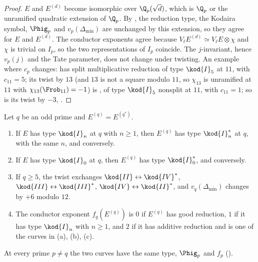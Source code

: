 \begin{proof}
$E$ and $E^{(d)}$ become isomorphic over $\Q_p(\sqrt d)$, which is $\Q_p$ or the unramified quadratic extension of $\Q_p$. By
, the reduction type, the Kodaira symbol, $\Phig_p$ and $v_p(\Delta_{\min})$ are unchanged by this
extension, so they agree for $E$ and $E^{(d)}$. The conductor exponents agree because $V_\ell E^{(d)}\simeq V_\ell E\otimes\chi$ and $\chi$
is trivial on $I_p$, so the two representations of $I_p$ coincide. The $j$-invariant, hence $v_p(j)$ and the Tate parameter, does
not change under twisting. An example where $c_p$ changes:  has split multiplicative reduction of type $\kod{I}_5$ at
$11$, with $c_{11}=5$; its twist by $13$ (and $13$ is not a square modulo $11$, so $\chi_{13}$ is unramified at $11$ with
$\chi_{13}(\Frob_{11})=-1$) is , of type $\kod{I}_5$ nonsplit at $11$, with $c_{11}=1$; so is its twist by $-3$,
.
\end{proof}

\begin{lemma}\label{lem:reduction:twist-ramified}
Let $q$ be an odd prime and $E^{(q)}=E^{(q^*)}$.
\begin{enumerate}[label=(\alph*)]
\item If $E$ has type $\kod{I}_n$ at $q$ with $n\ge1$, then $E^{(q)}$ has type $\kod{I}_n^*$ at $q$, with the same $n$, and conversely.
\item If $E$ has type $\kod{I}_0$ at $q$, then $E^{(q)}$ has type $\kod{I}_0^*$, and conversely.
\item If $q\ge5$, the twist exchanges $\kod{II}\leftrightarrow\kod{IV}^*$, $\kod{III}\leftrightarrow\kod{III}^*$, $\kod{IV}\leftrightarrow\kod{II}^*$,
and $v_q(\Delta_{\min})$ changes by $+6$ modulo $12$.
\item The conductor exponent $f_q(E^{(q)})$ is $0$ if $E^{(q)}$ has good reduction, $1$ if it has type $\kod{I}_n$ with $n\ge1$, and $2$
if it has additive reduction and is one of the curves in (a), (b), (c).
\end{enumerate}
At every prime $p\ne q$ the two curves have the same type, $\Phig_p$ and $f_p$ ().
\end{lemma}

